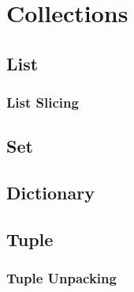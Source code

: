 \section{Collections}

  \subsection{List}

    \subsubsection{List Slicing}

  \subsection{Set}

  \subsection{Dictionary}

  \subsection{Tuple}

    \subsubsection{Tuple Unpacking}
    